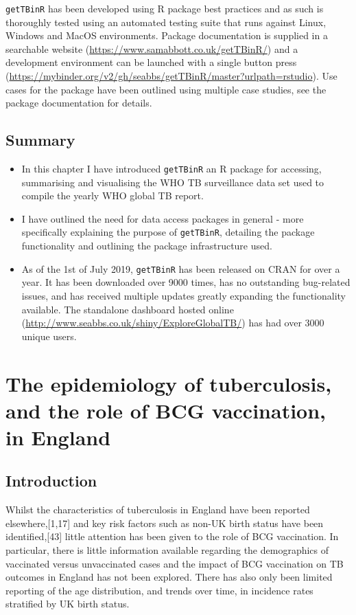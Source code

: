 \documentclass[11pt,twoside]{bristolthesis}
\begin{document}
  \texttt{getTBinR} has been developed using R package best practices and as such is thoroughly tested using an automated testing suite that runs against Linux, Windows and MacOS environments. Package documentation is supplied in a searchable website (\url{https://www.samabbott.co.uk/getTBinR/}) and a development environment can be launched with a single button press (\url{https://mybinder.org/v2/gh/seabbs/getTBinR/master?urlpath=rstudio}). Use cases for the package have been outlined using multiple case studies, see the package documentation for details.
  
  \hypertarget{summary-2}{%
  \section{Summary}\label{summary-2}}
  \begin{itemize}
  \item
    In this chapter I have introduced \texttt{getTBinR} an R package for accessing, summarising and visualising the WHO TB surveillance data set used to compile the yearly WHO global TB report.
  \item
    I have outlined the need for data access packages in general - more specifically explaining the purpose of \texttt{getTBinR}, detailing the package functionality and outlining the package infrastructure used.
  \item
    As of the 1st of July 2019, \texttt{getTBinR} has been released on CRAN for over a year. It has been downloaded over 9000 times, has no outstanding bug-related issues, and has received multiple updates greatly expanding the functionality available. The standalone dashboard hosted online (\url{http://www.seabbs.co.uk/shiny/ExploreGlobalTB/}) has had over 3000 unique users.
  \end{itemize}
  \hypertarget{data}{%
  \chapter{The epidemiology of tuberculosis, and the role of BCG vaccination, in England}\label{data}}
  
  \hypertarget{introduction-2}{%
  \section{Introduction}\label{introduction-2}}
  
  Whilst the characteristics of tuberculosis in England have been reported elsewhere,{[}1,17{]} and key risk factors such as non-UK birth status have been identified,{[}43{]} little attention has been given to the role of BCG vaccination. In particular, there is little information available regarding the demographics of vaccinated versus unvaccinated cases and the impact of BCG vaccination on TB outcomes in England has not been explored. There has also only been limited reporting of the age distribution, and trends over time, in incidence rates stratified by UK birth status.
  
\end{document}
